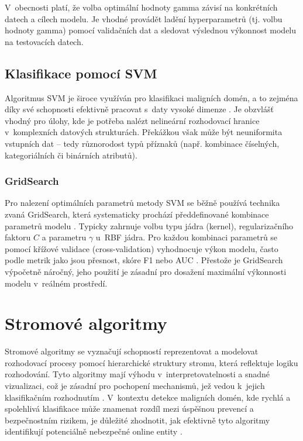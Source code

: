 V~obecnosti platí, že volba optimální hodnoty gamma závisí na konkrétních datech a cílech modelu. Je vhodné provádět ladění hyperparametrů (tj. volbu hodnoty gamma) pomocí validačních dat a sledovat výslednou výkonnost modelu na testovacích datech.





\subsection{Klasifikace pomocí SVM}
Algoritmus SVM je široce využíván pro klasifikaci maligních domén, a to zejména díky své schopnosti efektivně pracovat s~daty vysoké dimenze \cite{cortes1995support}. Je obzvlášť vhodný pro úlohy, kde je potřeba nalézt nelineární rozhodovací hranice v~komplexních datových strukturách. Překážkou však může být neuniformita vstupních dat – tedy různorodost typů příznaků (např. kombinace číselných, kategoriálních či binárních atributů).




\subsubsection{GridSearch}

Pro nalezení optimálních parametrů metody SVM se běžně používá technika zvaná GridSearch, která systematicky prochází předdefinované kombinace parametrů modelu \cite{bergstra2011algorithms}. Typicky zahrnuje volbu typu jádra (kernel), regularizačního faktoru \(C\) a parametru \(\gamma\) u~RBF jádra. Pro každou kombinaci parametrů se pomocí křížové validace (cross-validation) vyhodnocuje výkon modelu, často podle metrik jako jsou přesnost, skóre F1 nebo AUC \cite{bergstra2011algorithms, ml_general}. Přestože je GridSearch výpočetně náročný, jeho použití je zásadní pro dosažení maximální výkonnosti modelu v~reálném prostředí.







\section{Stromové algoritmy}

Stromové algoritmy se vyznačují schopností reprezentovat a modelovat rozhodovací procesy pomocí hierarchické struktury stromu, která reflektuje logiku rozhodování. Tyto algoritmy mají výhodu v~interpretovatelnosti a snadné vizualizaci, což je zásadní pro pochopení mechanismů, jež vedou k~jejich klasifikačním rozhodnutím \cite{quinlan1986induction}. V~kontextu detekce maligních domén, kde rychlá a spolehlivá klasifikace může znamenat rozdíl mezi úspěšnou prevencí a bezpečnostním rizikem, je důležité zhodnotit, jak efektivně tyto algoritmy identifikují potenciálně nebezpečné online entity \cite{silveira2021detection, zou2019detecting}.

